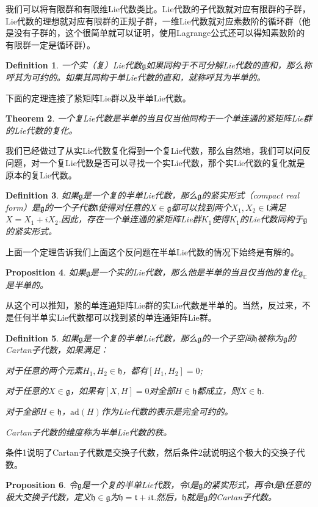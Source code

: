 \documentclass[8pt]{book}
\theoremstyle{plain}
\newtheorem{defi}{Definition}
\newtheorem{pro}[defi]{Proposition}
\newtheorem{theo}[defi]{Theorem}
\newcommand{\cc}{\mathbb{C}}
\newcommand{\lag}{{\mathfrak{g}}}  %
\newcommand{\ad}{{\mathrm{ad}}}
\begin{document}
我们可以将有限群和有限维Lie代数类比。Lie代数的子代数就对应有限群的子群，Lie代数的理想就对应有限群的正规子群，一维Lie代数就对应素数阶的循环群（他是没有子群的，这个很简单就可以证明，使用Lagrange公式还可以得知素数阶的有限群一定是循环群）。

\begin{defi}
一个实（复）Lie代数$\lag$如果同构于不可分解Lie代数的直和，那么称呼其为可约的。如果其同构于单Lie代数的直和，就称呼其为半单的。
\end{defi}
下面的定理连接了紧矩阵Lie群以及半单Lie代数。
\begin{theo}
一个复Lie代数是半单的当且仅当他同构于一个单连通的紧矩阵Lie群的Lie代数的复化。
\end{theo}
我们已经做过了从实Lie代数复化得到一个复Lie代数，那么自然地，我们可以问反问题，对一个复Lie代数是否可以寻找一个实Lie代数，那个实Lie代数的复化就是原本的复Lie代数。
\begin{defi}
如果$\lag$是一个复的半单Lie代数，那么$\lag$的紧实形式（compact real form）是$\lag$的一个子代数$\mathfrak{l}$使得对任意的$X\in\lag$都可以找到两个$X_1,X_2\in\mathfrak{l}$满足$X=X_1+iX_2$.因此，存在一个单连通的紧矩阵Lie群$K_1$使得$K_1$的Lie代数同构于$\lag$的紧实形式。
\end{defi}
上面一个定理告诉我们上面这个反问题在半单Lie代数的情况下始终是有解的。
\begin{pro}
如果$\lag$是一个实的Lie代数，那么他是半单的当且仅当他的复化$\lag_\cc$是半单的。
\end{pro}
从这个可以推知，紧的单连通矩阵Lie群的实Lie代数是半单的。当然，反过来，不是任何半单实Lie代数都可以找到紧的单连通矩阵Lie群。
\begin{defi}
如果$\lag$是一个复的半单Lie代数，那么$\lag$的一个子空间$\mathfrak{h}$被称为$\lag$的Cartan子代数，如果满足：

 对于任意的两个元素$H_1,H_2\in\mathfrak{h}$，都有$[H_1,H_2]=0$;

 对于任意的$X\in \lag$，如果有$[X,H]=0$对全部$H\in\mathfrak{h}$都成立，则$X\in \mathfrak{h}$.

 对于全部$H\in \mathfrak{h}$，$\ad(H)$作为Lie代数的表示是完全可约的。

Cartan子代数的维度称为半单Lie代数的秩。
\end{defi}
条件1说明了Cartan子代数是交换子代数，然后条件2就说明这个极大的交换子代数。
\begin{pro}
令$\lag$是一个复的半单Lie代数，令$\mathfrak{l}$是$\lag$的紧实形式，再令$\mathfrak{t}$是$\mathfrak{l}$任意的极大交换子代数，定义$\mathfrak{h}\in\lag$为$\mathfrak{h}=\mathfrak{t}+i\mathfrak{t}$.然后，$\mathfrak{h}$就是$\lag$的Cartan子代数。
\end{pro}
\end{document}
